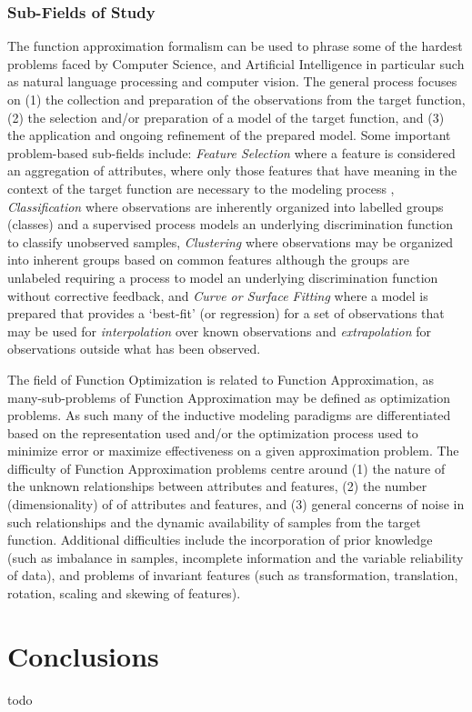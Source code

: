 \documentclass[a4paper, 11pt]{article}
\begin{document}
\subsubsection{Sub-Fields of Study}
The function approximation formalism can be used to phrase some of the hardest problems faced by Computer Science, and Artificial Intelligence in particular such as natural language processing and computer vision. 
The general process focuses on (1) the collection and preparation of the observations from the target function, (2) the selection and/or preparation of a model of the target function, and (3) the application and ongoing refinement of the prepared model. 
Some important problem-based sub-fields include: \emph{Feature Selection} where a feature is considered an aggregation of attributes, where only those features that have meaning in the context of the target function are necessary to the modeling process \cite{Kudo2000, Guyon2003}, \emph{Classification} where observations are inherently organized into labelled groups (classes) and a supervised process models an underlying discrimination function to classify unobserved samples, \emph{Clustering} where observations may be organized into inherent groups based on common features although the groups are unlabeled requiring a process to model an underlying discrimination function without corrective feedback, and \emph{Curve or Surface Fitting} where a model is prepared that provides a `best-fit' (or regression) for a set of observations that may be used for \emph{interpolation} over known observations and \emph{extrapolation} for observations outside what has been observed.

The field of Function Optimization is related to Function Approximation, as many-sub-problems of Function Approximation may be defined as optimization problems. As such many of the inductive modeling paradigms are differentiated based on the representation used and/or the optimization process used to minimize error or maximize effectiveness on a given approximation problem. 
The difficulty of Function Approximation problems centre around (1) the nature of the unknown relationships between attributes and features, (2) the number (dimensionality) of of attributes and features, and (3) general concerns of noise in such relationships and the dynamic availability of samples from the target function.
Additional difficulties include the incorporation of prior knowledge (such as imbalance in samples, incomplete information and the variable reliability of data), and problems of invariant features (such as transformation, translation, rotation, scaling and skewing of features).



% 
% 
\section{Conclusions}
\label{sec:conclusions}
todo



\end{document}
